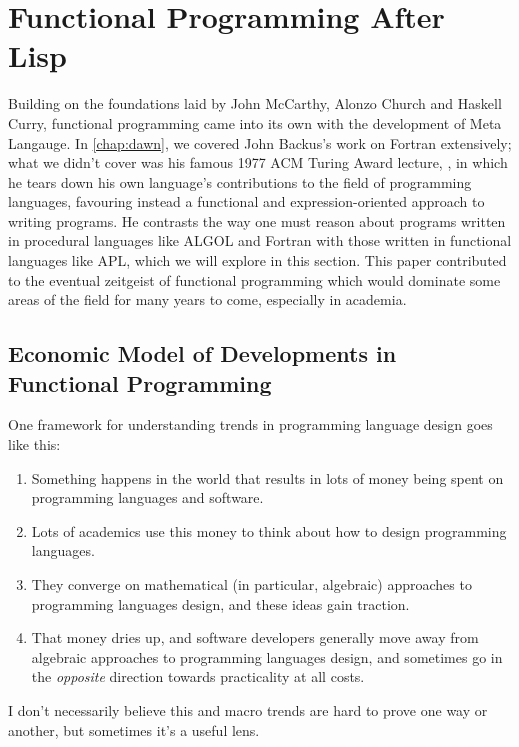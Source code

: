 \section{Functional Programming After Lisp}

Building on the foundations laid by John McCarthy, Alonzo Church and Haskell Curry, functional programming
came into its own with the development of Meta Langauge.
In \cref{chap:dawn}, we covered John Backus's work on Fortran extensively; what we didn't cover was his
famous 1977 ACM Turing Award lecture, , in which
he tears down his own language's contributions to the field of programming languages, favouring
instead a functional and expression-oriented approach to writing programs.
He contrasts the way one must reason about programs written in procedural languages
like ALGOL and Fortran with those written in functional languages like APL, which we will explore in this section.
This paper contributed to the eventual zeitgeist of functional programming which would dominate
some areas of the field for many years to come, especially in academia.

\iftrue
	\subsection{Economic Model of Developments in Functional Programming}
	One framework for understanding trends in programming language design
	goes like this:

	\begin{enumerate}
		\item Something happens in the world that results in lots of money being spent on
		      programming languages and software.
		\item Lots of academics use this money to think about how to design programming languages.
		\item They converge on mathematical (in particular, algebraic)
		      approaches to programming languages design,
		      and these ideas gain traction.
		\item That money dries up, and software developers generally move
		      away from algebraic approaches to programming languages design,
		      and sometimes go in the \textit{opposite} direction towards
		      practicality at all costs.
	\end{enumerate}

	I don't necessarily believe this and macro trends are hard to prove one
	way or another, but sometimes it's a useful lens.

